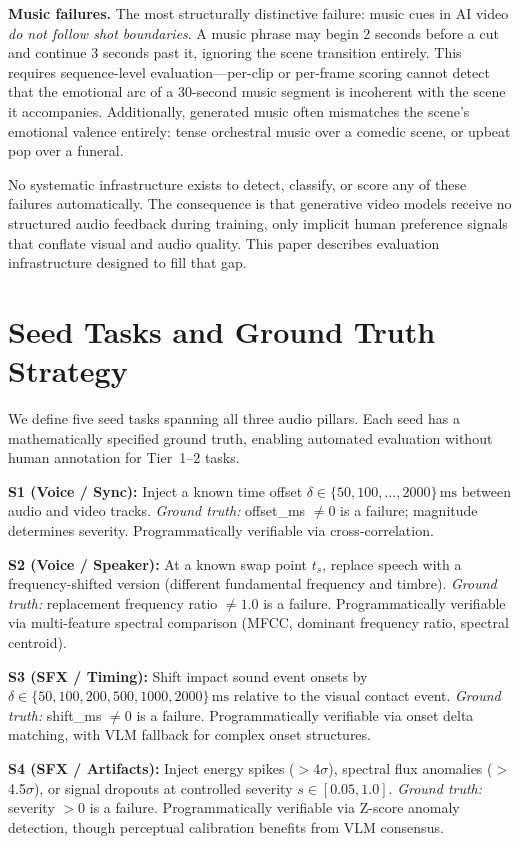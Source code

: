 \documentclass[11pt]{article}
\begin{document}
\textbf{Music failures.} The most structurally distinctive failure: music cues in AI video
\emph{do not follow shot boundaries}. A music phrase may begin 2 seconds before a cut and
continue 3 seconds past it, ignoring the scene transition entirely. This requires
sequence-level evaluation---per-clip or per-frame scoring cannot detect that the emotional
arc of a 30-second music segment is incoherent with the scene it accompanies. Additionally,
generated music often mismatches the scene's emotional valence entirely: tense orchestral
music over a comedic scene, or upbeat pop over a funeral.

No systematic infrastructure exists to detect, classify, or score any of these failures
automatically. The consequence is that generative video models receive no structured audio
feedback during training, only implicit human preference signals that conflate visual and
audio quality. This paper describes evaluation infrastructure designed to fill that gap.

\section{Seed Tasks and Ground Truth Strategy}

We define five seed tasks spanning all three audio pillars. Each seed has a mathematically
specified ground truth, enabling automated evaluation without human annotation for
Tier~1--2 tasks.

\textbf{S1 (Voice / Sync):} Inject a known time offset $\delta \in \{50, 100, \ldots,
2000\}\,\text{ms}$ between audio and video tracks. \emph{Ground truth:} offset\_ms $\neq 0$
is a failure; magnitude determines severity. Programmatically verifiable via cross-correlation.

\textbf{S2 (Voice / Speaker):} At a known swap point $t_s$, replace speech with a
frequency-shifted version (different fundamental frequency and timbre). \emph{Ground truth:}
replacement frequency ratio $\neq 1.0$ is a failure. Programmatically verifiable via
multi-feature spectral comparison (MFCC, dominant frequency ratio, spectral centroid).

\textbf{S3 (SFX / Timing):} Shift impact sound event onsets by $\delta \in \{50, 100, 200,
500, 1000, 2000\}\,\text{ms}$ relative to the visual contact event. \emph{Ground truth:}
shift\_ms $\neq 0$ is a failure. Programmatically verifiable via onset delta matching, with
VLM fallback for complex onset structures.

\textbf{S4 (SFX / Artifacts):} Inject energy spikes ($>$4$\sigma$), spectral flux anomalies
($>$4.5$\sigma$), or signal dropouts at controlled severity $s \in [0.05, 1.0]$.
\emph{Ground truth:} severity $> 0$ is a failure. Programmatically verifiable via Z-score
anomaly detection, though perceptual calibration benefits from VLM consensus.
\end{document}
